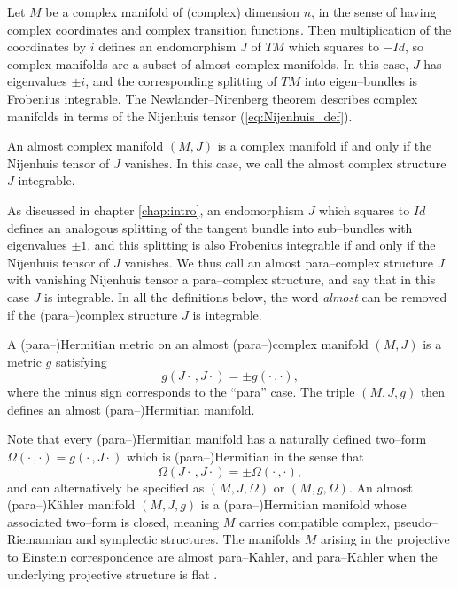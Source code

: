 Let $M$ be a complex manifold of (complex) dimension $n$, in the sense of having complex coordinates and complex transition functions. Then multiplication of the coordinates by $i$ defines an endomorphism $J$ of $TM$ which squares to $-Id$, so complex manifolds are a subset of almost complex manifolds. In this case, $J$ has eigenvalues $\pm i$, and the corresponding splitting of $TM$ into eigen--bundles is Frobenius integrable. The Newlander--Nirenberg theorem describes complex manifolds in terms of the Nijenhuis tensor (\ref{eq:Nijenhuis_def}).

\begin{theo}[\cite{CG}]
An almost complex manifold $(M,J)$ is a complex manifold if and only if the Nijenhuis tensor of $J$ vanishes. In this case, we call the almost complex structure $J$ integrable.
\end{theo}


As discussed in chapter \ref{chap:intro}, an endomorphism $J$ which squares to $Id$ defines an analogous splitting of the tangent bundle into sub--bundles with eigenvalues $\pm 1$, and this splitting is also Frobenius integrable if and only if the Nijenhuis tensor of $J$ vanishes. We thus call an almost para--complex structure $J$ with vanishing Nijenhuis tensor a para--complex structure, and say that in this case $J$ is integrable. In all the definitions below, the word \textit{almost} can be removed if the (para--)complex structure $J$ is integrable.

\begin{defi}
A (para--)Hermitian metric on an almost (para--)complex manifold $(M,J)$ is a metric $g$ satisfying
\[
g(J\cdot\,,J\cdot) = \pm g(\cdot\,,\cdot),
\]
where the minus sign corresponds to the ``para'' case. The triple $(M,J,g)$ then defines an almost (para--)Hermitian manifold.
\end{defi}

Note that every (para--)Hermitian manifold has a naturally defined two--form $\Omega(\cdot\,,\cdot)=g(\cdot\,,J\cdot)$ which is (para--)Hermitian in the sense that
\[
\Omega(J\cdot\,,J\cdot) = \pm \Omega(\cdot\,,\cdot),
\]
and can alternatively be specified as $(M,J,\Omega)$ or $(M,g,\Omega)$. An almost (para--)K\"ahler manifold $(M,J,g)$ is a (para--)Hermitian manifold whose associated two--form is closed, meaning $M$ carries compatible complex, pseudo--Riemannian and symplectic structures. The manifolds $M$ arising in the projective to Einstein correspondence are almost para--K\"ahler, and para--K\"ahler when the underlying projective structure is flat \cite{DM}.

